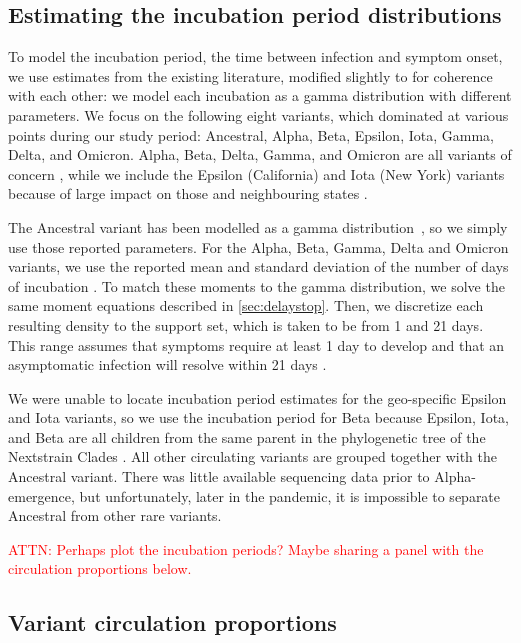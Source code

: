 \documentclass{article}
\newcommand{\attn }[1]{\textcolor{red}{ATTN: #1}}
\begin{document}
\subsection{Estimating the incubation period distributions} 
\label{sec:incubation}

To model the incubation period, the time between infection and symptom onset, we
use estimates from the existing literature, modified slightly to for coherence
with each other: we model each incubation as a gamma distribution with different
parameters. We focus on the following eight variants, which dominated at various
points during our study period: Ancestral, Alpha, Beta, Epsilon, Iota, Gamma,
Delta, and Omicron. Alpha, Beta, Delta, Gamma, and Omicron are all variants of
concern \citep{who2021tracking}, while we include the Epsilon (California) and
Iota (New York) variants because of large impact on those and neighbouring
states \citep{yang2022investigation, duerr2021dominance}.

The Ancestral variant has been modelled as a gamma
distribution~\citep{tindale2020evidence}, so we simply use those reported
parameters. For the Alpha, Beta, Gamma, Delta and Omicron variants, we use the
reported mean and standard deviation of the number of days of incubation
\citep{tanaka2022shorter, grant2022impact, ogata2022shorter}. To match these
moments to the gamma distribution, we solve the same moment equations described
in \autoref{sec:delaystop}. Then, we discretize each resulting density to the support set,
which is taken to be from 1 and 21 days. This range assumes that symptoms
require at least 1 day to develop \citealp{phcan2021covid} and that an
asymptomatic infection will resolve within 21 days \citep{zaki2021estimations,cortes2022sars}.

We were unable to locate incubation period estimates
for the geo-specific Epsilon and Iota variants, so we use the
incubation period for Beta because Epsilon, Iota, and Beta are all children from
the same parent in the phylogenetic tree of the Nextstrain Clades
\citep{hodcroft2021covariants}. All other circulating variants are grouped
together with the Ancestral variant. There was little available sequencing data
prior to Alpha-emergence, but unfortunately, later in the pandemic, it is
impossible to separate Ancestral from other rare variants.

\attn{Perhaps plot the incubation periods? Maybe sharing a panel with the circulation proportions below.}

\subsection{Variant circulation proportions}
\label{sec:variant-proportions}
\end{document}
